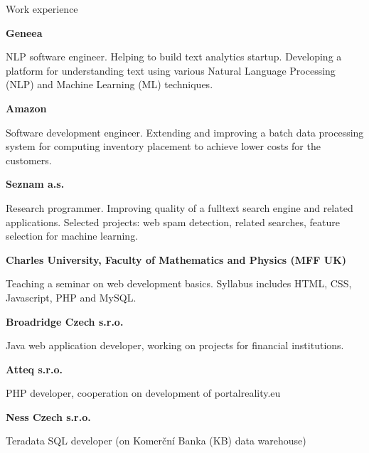 \begin{rubric}{Work experience}

\entry*[2014 - today]
\textbf{Geneea}

\entry* 
NLP software engineer. Helping to build text analytics startup. Developing a platform for understanding text using various Natural Language Processing (NLP) and Machine Learning (ML) techniques.

\entry*[2012 - 2014]
\textbf{Amazon}

\entry* 
Software development engineer. Extending and improving a batch data processing system for computing  inventory placement to achieve lower costs for the customers. 

\entry*[2011 - 2012]
\textbf{Seznam a.s.}

\entry* 
Research programmer. Improving quality of a fulltext search engine and related applications. Selected projects: web spam detection, related searches, feature selection for machine learning.

\entry*[2010]
\textbf{Charles University, Faculty of Mathematics and Physics (MFF UK)}

\entry* 
Teaching a seminar on web development basics. Syllabus includes HTML, CSS, Javascript, PHP and MySQL. 

\entry*[2008 - 2010]
\textbf{Broadridge Czech s.r.o.}

\entry* 
Java web application developer, working on projects for financial institutions.

\entry*[2008]
\textbf{Atteq s.r.o.}

\entry* 
PHP developer, cooperation on development of portalreality.eu

\entry*[2007]
\textbf{Ness Czech s.r.o.}

\entry* 
Teradata SQL developer (on Komerční Banka (KB) data warehouse)

\end{rubric}